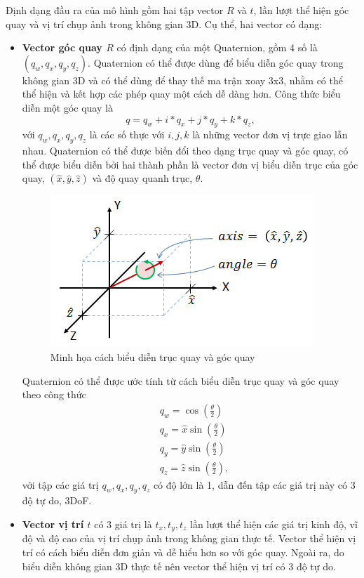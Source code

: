 Định dạng đầu ra của mô hình gồm hai tập vector $R$ và $t$, lần lượt thể hiện góc quay và vị trí chụp ảnh trong không gian 3D. Cụ thể, hai vector có dạng:
\begin{itemize}
    \item \textbf{Vector góc quay $R$} có định dạng của một Quaternion, gồm 4 số là $(q_w, q_x, q_y, q_z)$. Quaternion có thể được dùng để biểu diễn góc quay trong không gian 3D và có thể dùng để thay thế ma trận xoay 3x3, nhằm có thể thể hiện và kết hợp các phép quay một cách dễ dàng hơn. Công thức biểu diễn một góc quay là
          \begin{equation}
              q=q_w + i*q_x + j*q_y + k*q_z,
          \end{equation}
          với $q_w, q_x, q_y, q_z$ là các số thực với $i,j,k$ là những vector đơn vị trực giao lẫn nhau. Quaternion có thể được biến đổi theo dạng trục quay và góc quay, có thể được biểu diễn bởi hai thành phần là vector đơn vị biểu diễn trục của góc quay, $(\hat{x},\hat{y},\hat{z})$ và độ quay quanh trục, $\theta$.
          \begin{figure}[H]
              \centering
              \includegraphics[scale=1]{pics/Proposal/axis-angle.png}
              \caption{Minh họa cách biểu diễn trục quay và góc quay \cite{quaternion}}
          \end{figure}
          Quaternion có thể được ước tính từ cách biểu diễn trục quay và góc quay theo công thức
          \begin{equation}
              \begin{aligned}
                   & q_w=\cos \left(\frac{\theta}{2}\right)          \\
                   & q_x=\hat{x} \sin \left(\frac{\theta}{2}\right)  \\
                   & q_y=\hat{y} \sin \left(\frac{\theta}{2}\right)  \\
                   & q_z=\hat{z} \sin \left(\frac{\theta}{2}\right),
              \end{aligned}
          \end{equation}
          với tập các giá trị $q_w, q_x, q_y, q_z$ có độ lớn là 1, dẫn đến tập các giá trị này có 3 độ tự do, 3DoF.
    \item \textbf{Vector vị trí $t$} có 3 giá trị là $t_x,t_y,t_z$ lần lượt thể hiện các giá trị kinh độ, vĩ độ và độ cao của vị trí chụp ảnh trong không gian thực tế. Vector thể hiện vị trí có cách biểu diễn đơn giản và dễ hiểu hơn so với góc quay. Ngoài ra, do biểu diễn không gian 3D thực tế nên vector thể hiện vị trí có 3 độ tự do.
\end{itemize}




